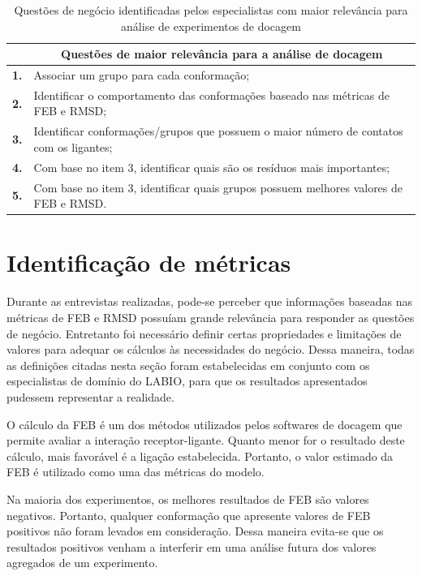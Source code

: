 \begin{table}[h]
\caption{Questões de negócio identificadas pelos especialistas com maior relevância para análise de experimentos de docagem}
\label{tab:questaoNegocio}
\centering
\begin{tabular}{@{}ll@{}}
\toprule
\textbf{ } & \multicolumn{1}{c}{\textbf{Questões de maior relevância para a análise de docagem}}		\\ \midrule
\textbf{1.} & Associar um grupo para cada conformação;													\\
\textbf{2.} & Identificar o comportamento das conformações baseado nas métricas de FEB e RMSD;			\\
\textbf{3.} & Identificar conformações/grupos que possuem o maior número de contatos com os ligantes;	\\
\textbf{4.} & Com base no item 3, identificar quais são os resíduos mais importantes;					\\
\textbf{5.} & Com base no item 3, identificar quais grupos possuem melhores valores de FEB e RMSD.		\\ \bottomrule
\end{tabular}
\end{table}

\section{Identificação de métricas}
\label{sec:IdentificacaoDeMetricas}

Durante as entrevistas realizadas, pode-se perceber que informações baseadas nas métricas de FEB e RMSD possuíam grande relevância para responder as questões de negócio. Entretanto foi necessário definir certas propriedades e limitações de valores para adequar os cálculos às necessidades do negócio. Dessa maneira, todas as definições citadas nesta seção foram estabelecidas em conjunto com os especialistas de domínio do LABIO, para que os resultados apresentados pudessem representar a realidade.

O cálculo da FEB é um dos métodos utilizados pelos softwares de docagem que permite avaliar a interação receptor-ligante. Quanto menor for o resultado deste cálculo, mais favorável é a ligação estabelecida. Portanto, o valor estimado da FEB é utilizado como uma das métricas do modelo.

Na maioria dos experimentos, os melhores resultados de FEB são valores negativos. Portanto, qualquer conformação que apresente valores de FEB positivos não foram levados em consideração. Dessa maneira evita-se que os resultados positivos venham a interferir em uma análise futura dos valores agregados de um experimento. 

